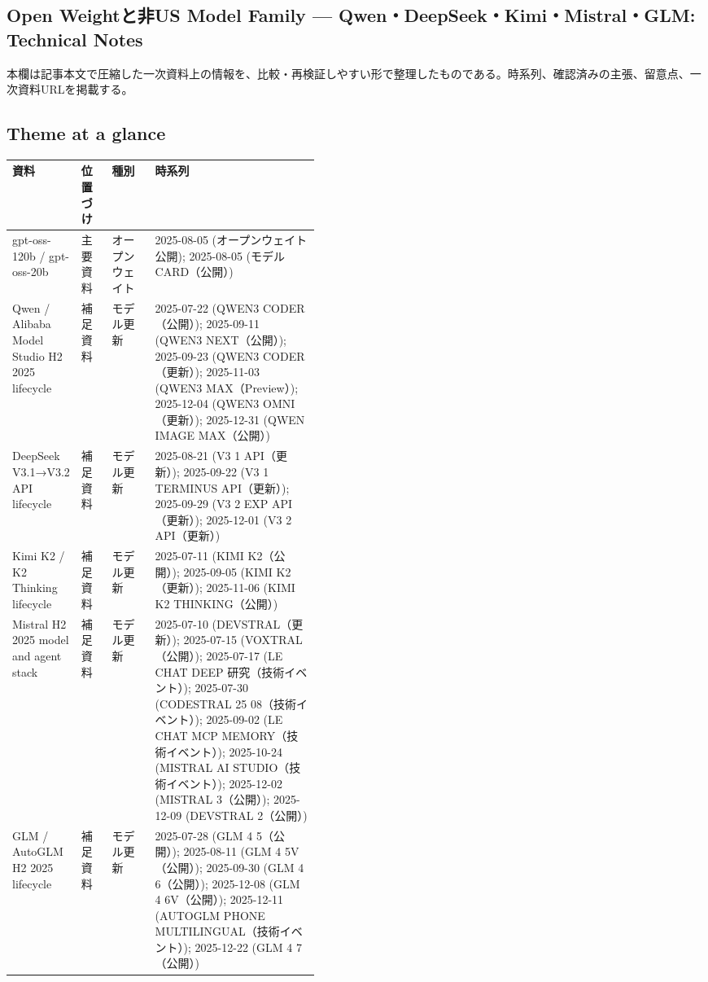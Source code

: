 \subsection*{Open Weightと非US Model Family — Qwen・DeepSeek・Kimi・Mistral・GLM: Technical Notes}
本欄は記事本文で圧縮した一次資料上の情報を、比較・再検証しやすい形で整理したものである。時系列、確認済みの主張、留意点、一次資料URLを掲載する。
\medskip
\subsection*{Theme at a glance}
\begin{center}
\footnotesize
\begin{tabularx}{\linewidth}{@{}p{0.20\linewidth}p{0.10\linewidth}p{0.14\linewidth}X@{}}
\toprule
資料 & 位置づけ & 種別 & 時系列 \\
\midrule
gpt-oss-120b / gpt-oss-20b & 主要資料 & オープンウェイト & 2025-08-05 (オープンウェイト公開); 2025-08-05 (モデル CARD（公開）)  \\
Qwen / Alibaba Model Studio H2 2025 lifecycle & 補足資料 & モデル更新 & 2025-07-22 (QWEN3 CODER（公開）); 2025-09-11 (QWEN3 NEXT（公開）); 2025-09-23 (QWEN3 CODER（更新）); 2025-11-03 (QWEN3 MAX（Preview）); 2025-12-04 (QWEN3 OMNI（更新）); 2025-12-31 (QWEN IMAGE MAX（公開）)  \\
DeepSeek V3.1→V3.2 API lifecycle & 補足資料 & モデル更新 & 2025-08-21 (V3 1 API（更新）); 2025-09-22 (V3 1 TERMINUS API（更新）); 2025-09-29 (V3 2 EXP API（更新）); 2025-12-01 (V3 2 API（更新）)  \\
Kimi K2 / K2 Thinking lifecycle & 補足資料 & モデル更新 & 2025-07-11 (KIMI K2（公開）); 2025-09-05 (KIMI K2（更新）); 2025-11-06 (KIMI K2 THINKING（公開）)  \\
Mistral H2 2025 model and agent stack & 補足資料 & モデル更新 & 2025-07-10 (DEVSTRAL（更新）); 2025-07-15 (VOXTRAL（公開）); 2025-07-17 (LE CHAT DEEP 研究（技術イベント）); 2025-07-30 (CODESTRAL 25 08（技術イベント）); 2025-09-02 (LE CHAT MCP MEMORY（技術イベント）); 2025-10-24 (MISTRAL AI STUDIO（技術イベント）); 2025-12-02 (MISTRAL 3（公開）); 2025-12-09 (DEVSTRAL 2（公開）)  \\
GLM / AutoGLM H2 2025 lifecycle & 補足資料 & モデル更新 & 2025-07-28 (GLM 4 5（公開）); 2025-08-11 (GLM 4 5V（公開）); 2025-09-30 (GLM 4 6（公開）); 2025-12-08 (GLM 4 6V（公開）); 2025-12-11 (AUTOGLM PHONE MULTILINGUAL（技術イベント）); 2025-12-22 (GLM 4 7（公開）)  \\
\bottomrule
\end{tabularx}
\end{center}
\normalsize

